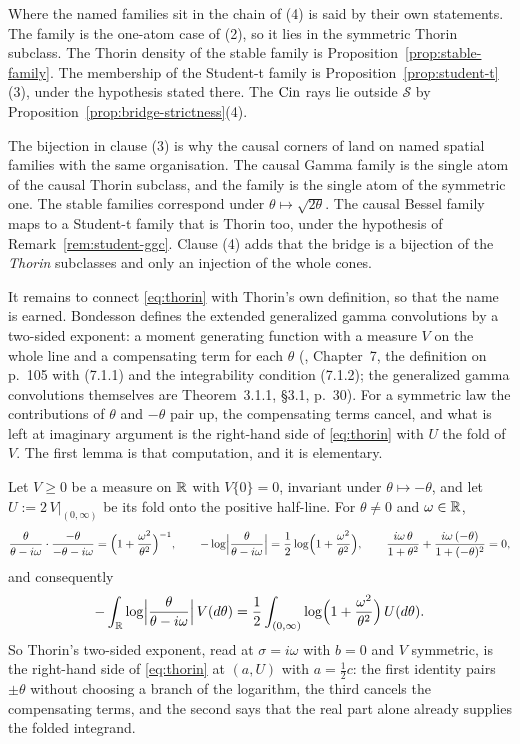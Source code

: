 Where the named families sit in the chain of (4) is said by their own statements. The
\Matern{} family is the one-atom case of (2), so it lies in the symmetric Thorin subclass. The
Thorin density of the stable family is Proposition~\ref{prop:stable-family}. The membership of
the Student-t family is Proposition~\ref{prop:student-t}(3), under the hypothesis stated
there. The $\operatorname{Cin}$ rays lie outside $\mathcal{S}$ by Proposition~\ref{prop:bridge-strictness}(4).

The bijection in clause (3) is why the causal corners of  land
on named spatial families with the same organisation. The causal Gamma family is the single
atom of the causal Thorin subclass, and the \Matern{} family is the single atom of the
symmetric one. The stable families correspond under $\theta \mapsto \sqrt{2\theta}$. The causal
Bessel family maps to a Student-t family that is Thorin too, under the hypothesis of
Remark~\ref{rem:student-ggc}. Clause (4) adds
that the bridge is a bijection of the \emph{Thorin} subclasses and only an injection of the
whole cones.

It remains to connect \ref{eq:thorin} with Thorin's own definition, so that the name is
earned. Bondesson defines the extended generalized gamma convolutions by a two-sided
exponent: a moment generating function with a measure $V$ on the whole line and a compensating
term for each $\theta$ (, Chapter~7, the definition on p.~105
with (7.1.1) and the integrability condition (7.1.2); the generalized gamma convolutions
themselves are Theorem~3.1.1, \S3.1, p.~30). For a symmetric law the contributions of $\theta$
and $-\theta$ pair up, the compensating terms cancel, and what is left at imaginary argument
is the right-hand side of \ref{eq:thorin} with $U$ the fold of $V$. The first lemma is that
computation, and it is elementary.

\begin{lemma}[Thorin's two-sided exponent at $\sigma = i\omega$]\label{lem:thorin-two-sided}
Let $V \ge 0$ be a measure on $\mathbb{R}$ with $V\{0\} = 0$, invariant under $\theta \mapsto -\theta$,
and let $U := 2\,V|_{(0,\infty)}$ be its fold onto the positive half-line. For $\theta \ne 0$ and
$\omega \in \mathbb{R}$,
\[
  \frac{\theta}{\theta - i\omega}\cdot\frac{-\theta}{-\theta - i\omega}
   = \Bigl(1 + \frac{\omega^2}{\theta^2}\Bigr)^{-1},
  \qquad
  -\log\Bigl|\frac{\theta}{\theta - i\omega}\Bigr|
   = \frac12\log\Bigl(1 + \frac{\omega^2}{\theta^2}\Bigr),
  \qquad
  \frac{i\omega\,\theta}{1+\theta^2} + \frac{i\omega\,(-\theta)}{1+(-\theta)^2} = 0 ,
\]
and consequently
\[
  -\int_{\mathbb{R}}\log\Bigl|\frac{\theta}{\theta - i\omega}\Bigr|\,V(d\theta)
   = \frac12\int_{(0,\infty)}\log\Bigl(1 + \frac{\omega^2}{\theta^2}\Bigr)\,U(d\theta) .
\]
So Thorin's two-sided exponent, read at $\sigma = i\omega$ with $b = 0$ and $V$ symmetric, is the
right-hand side of \ref{eq:thorin} at $(a, U)$ with $a = \tfrac12c$: the first identity pairs
$\pm\theta$ without choosing a branch of the logarithm, the third cancels the compensating terms,
and the second says that the real part alone already supplies the folded integrand.
\end{lemma}

